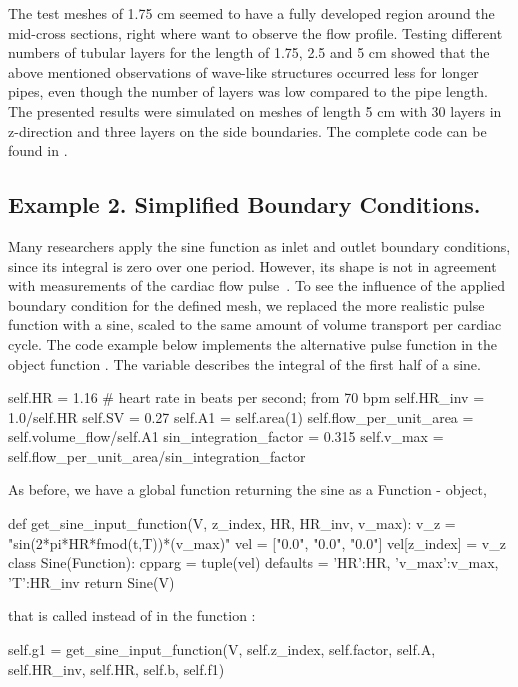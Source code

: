 The test meshes of 1.75 cm seemed to have a fully developed region around the mid-cross sections, right where want to observe the flow profile. Testing different numbers of tubular layers for the length of 1.75, 2.5 and 5 cm showed that the above mentioned observations of wave-like structures occurred less for longer pipes, even though the number of layers was low compared to the pipe length.
The presented results were simulated on meshes of length 5 cm with 30 layers in z-direction and three layers on the side boundaries. The complete code can be found in %
.\\






\subsection{Example 2. Simplified Boundary Conditions.}

Many researchers apply the sine function as inlet and outlet boundary conditions, since its integral is zero over one period. However, its shape is not in agreement with measurements of the cardiac flow pulse~\cite{Loth2001}. To see the influence of the applied boundary condition for the defined mesh, we replaced the more realistic pulse function with a sine, scaled to the same amount of volume transport per cardiac cycle. The code example below implements the alternative pulse function in the object function . The variable  describes the integral of the first half of a sine.
\begin{python}
self.HR = 1.16 # heart rate in beats per second; from 70 bpm
self.HR_inv = 1.0/self.HR
self.SV = 0.27
self.A1 = self.area(1)
self.flow_per_unit_area = self.volume_flow/self.A1
sin_integration_factor = 0.315
self.v_max = self.flow_per_unit_area/sin_integration_factor
\end{python}
As before, we have a global function returning the sine as a Function - object,
\begin{python}
def get_sine_input_function(V, z_index, HR, HR_inv, v_max):
	v_z = "sin(2*pi*HR*fmod(t,T))*(v_max)"
	vel = ["0.0", "0.0", "0.0"]
	vel[z_index] = v_z
	class Sine(Function):
		cpparg = tuple(vel)
		defaults = {'HR':HR, 'v_max':v_max, 'T':HR_inv}
	return Sine(V)
\end{python}
that is called instead of  in the function :
\begin{python}
self.g1 = get_sine_input_function(V, self.z_index, self.factor, self.A, self.HR_inv, self.HR, self.b, self.f1)
\end{python}



